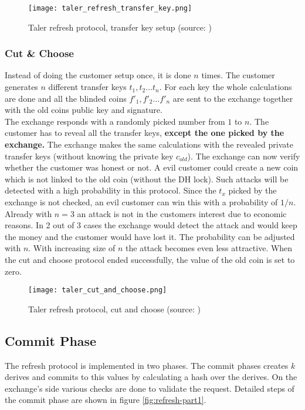     \begin{figure}[htp]
        \centering
        \texttt{[image: taler\_refresh\_transfer\_key.png]}
        \caption{Taler refresh protocol, transfer key setup (source: \cite{pic:refresh-prot})}
        \label{fig:taler-refresh-transfer-key}
    \end{figure}
    \newpage
    \subsubsection{Cut \& Choose}
    Instead of doing the customer setup once, it is done $n$ times.
    The customer generates $n$ different transfer keys $t_1, t_2 \dots t_n$.
    For each key the whole calculations are done and all the blinded coins $f'_1, f'_2 \dots f'_n$ are sent to the exchange together with the old coins public key and signature. \\
    The exchange responds with a randomly picked number from $1$ to $n$.
    The customer has to reveal all the transfer keys, \textbf{except the one picked by the exchange.}
    The exchange makes the same calculations with the revealed private transfer keys (without knowing the private key $c_{old}$).
    The exchange can now verify whether the customer was honest or not.
    A evil customer could create a new coin which is not linked to the old coin (without the DH lock).
    Such attacks will be detected with a high probability in this protocol.
    Since the $t_x$ picked by the exchange is not checked, an evil customer can win this with a probability of $1/n$.
    Already with $n=3$ an attack is not in the customers interest due to economic reasons.
    In 2 out of 3 cases the exchange would detect the attack and would keep the money and the customer would have lost it.
    The probability can be adjusted with $n$.
    With increasing size of $n$ the attack becomes even less attractive.
    When the cut and choose protocol ended successfully, the value of the old coin is set to zero.

    \begin{figure}[htp]
        \centering
        \texttt{[image: taler\_cut\_and\_choose.png]}
        \caption{Taler refresh protocol, cut and choose (source: \cite{pic:refresh-prot})}
        \label{fig:taler-cut-and-choose}
    \end{figure}

    \subsection{Commit Phase}
    \label{sec:commit-phase-rsa}
    The refresh protocol is implemented in two phases.
    The commit phases creates $k$ derives and commits to this values by calculating a hash over the derives.
    On the exchange's side various checks are done to validate the request.
    Detailed steps of the commit phase are shown in figure  \ref{fig:refresh-part1}.

